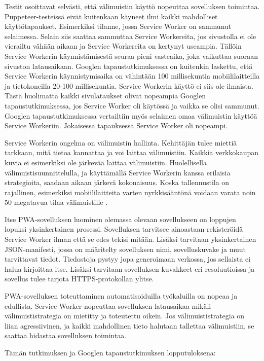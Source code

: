 \documentclass{tktltiki}
\begin{document}
Testit osoittavat selvästi, että välimuistin käyttö nopeuttaa sovelluksen toimintaa. Puppeteer-testeissä eivät kuitenkaan käyneet ilmi kaikki mahdolliset käyttötapaukset. Esimerkiksi tilanne, jossa Service Worker on sammunut selaimessa. Selain siis saattaa sammuttaa Service Workereita, jos sivustolla ei ole vierailtu vähään aikaan ja Service Workereita on kertynyt useampia. Tällöin Service Workerin käynnistämisestä seuraa pieni vasteaika, joka vaikuttaa suoraan sivuston latausaikaan. Googlen tapaustutkimuksessa on kuitenkin laskettu, että Service Workerin käynnistymisaika on vähintään 100 millisekuntia mobiililaitteilla ja tietokoneilla 20-100 millisekuntia. Service Workerin käyttö ei siis ole ilmaista. Tästä huolimatta kaikki sivulataukset olivat nopeampia Googlen tapaustutkimuksessa, jos Service Worker oli käytössä ja vaikka se olisi sammunut. Googlen tapaustutkimuksessa vertailtiin myös selaimen omaa välimuistin käyttöä Service Workeriin. Jokaisessa tapauksessa Service Worker oli nopeampi.

Service Workerin ongelma on välimuistin hallinta. Kehittäjän tulee miettiä tarkkaan, mitä tietoa kannattaa ja voi laittaa välimuistiin. Kaikkia verkkokaupan kuvia ei esimerkiksi ole järkevää laittaa välimuistiin. Huolellisella välimuistisuunnittelulla, ja käyttämällä Service Workerin kanssa erilaisia strategioita, saadaan aikaan järkevä kokonaisuus. Koska tallennustila on rajallinen, esimerkiksi mobiililaitteita varten nyrkkisääntönä voidaan varata noin 50 megatavua tilaa välimuistille \cite{Love}.

Itse PWA-sovelluksen luominen olemassa olevaan sovellukseen on loppujen lopuksi yksinkertainen prosessi. Sovelluksen tarvitsee ainoastaan rekisteröidä Service Worker ilman että se edes tekisi mitään. Lisäksi tarvitaan yksinkertainen JSON-manifesti, jossa on määritelty sovelluksen nimi, sovelluskuvake ja muut tarvittavat tiedot. Tiedostoja pystyy jopa generoimaan verkossa, jos sellaista ei halua kirjoittaa itse. Lisäksi tarvitaan sovelluksen kuvakkeet eri resoluutioissa ja sovellus tulee tarjota HTTPS-protokollan ylitse.

PWA-sovelluksen toteuttaminen automatisoiduilla työkaluilla on nopeaa ja edullista. Service Worker nopeuttaa sovelluksen latausaikaa mikäli välimuististrategia on mietitty ja toteutettu oikein. Jos välimuististrategia on liian agressiivinen, ja kaikki mahdollinen tieto halutaan tallettaa välimuistiin, se saattaa hidastaa sovelluksen toimintaa.

Tämän tutkimuksen ja Googlen tapaustutkimuksen lopputuloksena:
\end{document}
